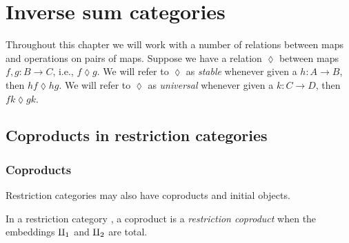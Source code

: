 \chapter{Inverse sum categories} %
\label{cha:inverse_sum_categories}

\begin{remark}
  Throughout this chapter we will work with a number of relations between maps and operations on
  pairs of maps. Suppose we have a relation $\lozenge$ between maps $f,g:B\to C$, i.e., $f \lozenge
  g$. We will refer to $\lozenge$ as \emph{stable} whenever given a $h:A \to B$, then $h f \lozenge
  h g$. We will refer to $\lozenge$ as \emph{universal} whenever given a $k:C \to D$, then $f k
  \lozenge g k$.
\end{remark}


\section{Coproducts in restriction categories} %
\label{sec:coproducts_in_restriction_categories}
\subsection{Coproducts} %
\label{sub:coproducts}

Restriction categories may also have coproducts and initial objects.
\begin{definition}
  In a restriction category \X, a coproduct is a \emph{restriction coproduct} when the embeddings
  $\amalg_{1}$ and $\amalg_{2}$ are total.
\end{definition}

